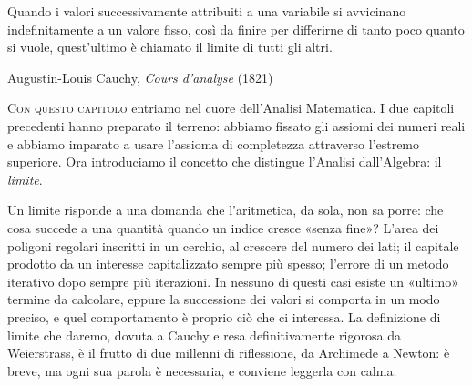 
\epigraph{Quando i valori successivamente attribuiti a una variabile si avvicinano
indefinitamente a un valore fisso, così da finire per differirne di tanto poco quanto si
vuole, quest'ultimo è chiamato il limite di tutti gli altri.}{Augustin-Louis Cauchy,
\emph{Cours d'analyse} (1821)}

\lettrine[lines=3, findent=2pt, nindent=0pt]{C}{on questo capitolo} entriamo nel cuore
dell'Analisi Matematica. I due capitoli precedenti hanno preparato il terreno: abbiamo
fissato gli assiomi dei numeri reali e abbiamo imparato a usare l'assioma di completezza
attraverso l'estremo superiore. Ora introduciamo il concetto che distingue l'Analisi
dall'Algebra: il \emph{limite}.

Un limite risponde a una domanda che l'aritmetica, da sola, non sa porre: che cosa
succede a una quantità quando un indice cresce «senza fine»? L'area dei poligoni
regolari inscritti in un cerchio, al crescere del numero dei lati; il capitale prodotto
da un interesse capitalizzato sempre più spesso; l'errore di un metodo iterativo dopo
sempre più iterazioni. In nessuno di questi casi esiste un «ultimo» termine da calcolare,
eppure la successione dei valori si comporta in un modo preciso, e quel comportamento è
proprio ciò che ci interessa. La definizione di limite che daremo, dovuta a Cauchy e
resa definitivamente rigorosa da Weierstrass, è il frutto di due millenni di riflessione,
da Archimede a Newton: è breve, ma ogni sua parola è necessaria, e conviene leggerla con
calma.

